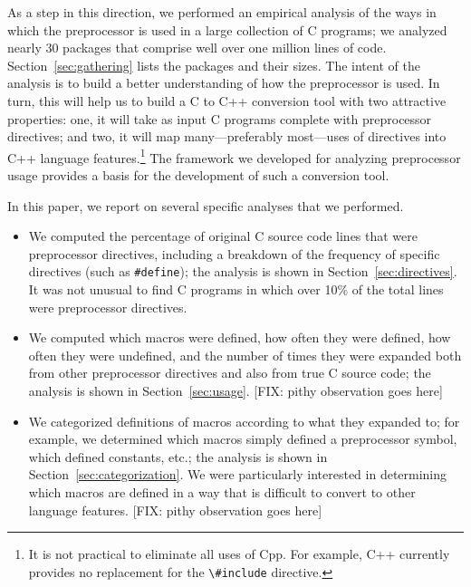 As a step in this direction, we performed an empirical analysis of the
ways in which the preprocessor is used in a large collection of C
programs; we analyzed nearly 30 packages that comprise well over one
million lines of code.  Section~\ref{sec:gathering} lists the packages
and their sizes.  The intent of the analysis is to build a better
understanding of how the preprocessor is used.  In turn, this will
help us to build a C to C++ conversion tool with two attractive
properties: one, it will take as input C programs complete with
preprocessor directives; and two, it will map many---preferably
most---uses of directives into C++ language features.\footnote{It is
not practical to eliminate all uses of Cpp.  For example, C++
currently provides no replacement for the \verb+\#include+ directive.}
The framework we developed for analyzing preprocessor usage provides a
basis for the development of such a conversion tool.

In this paper, we report on several specific analyses that we
performed.  
\begin{itemize}

\item We computed the percentage of original C source code lines that
were preprocessor directives, including a breakdown of the frequency
of specific directives (such as \verb+#define+); the analysis is shown
in Section~\ref{sec:directives}. It was not unusual to find C programs
in which over 10\% of the total lines were preprocessor directives.

\item We computed which macros were defined, how often they were
defined, how often they were undefined, and the number of times they
were expanded both from other preprocessor directives and also from
true C source code; the analysis is shown in Section~\ref{sec:usage}.
[FIX: pithy observation goes here]

\item We categorized definitions of macros according to what they
      expanded to; for example, we determined which macros simply
      defined a preprocessor symbol, which defined constants, etc.;
      the analysis is shown in Section~\ref{sec:categorization}.  We
      were particularly interested in determining which macros are
      defined in a way that is difficult to convert to other language
      features.  [FIX: pithy observation goes here]

\end{itemize}


